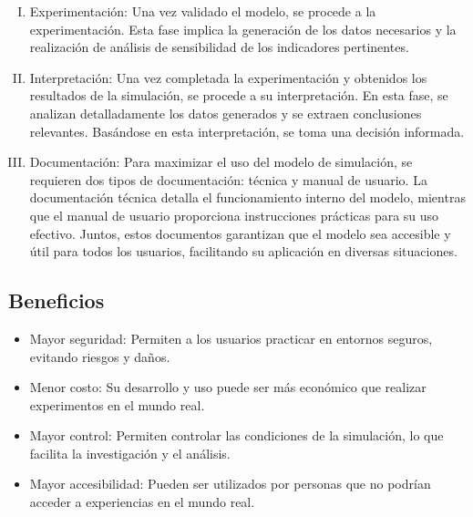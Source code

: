 \begin{enumerate} [I. ]
\begin{itemize}
        \item Evaluación de la precisión en la predicción de eventos futuros.
        \item Comprobación de la falla del modelo de simulación al utilizar datos que causen fallas en el sistema real.
        \item Aceptación y confianza en el modelo por parte de las personas que utilizarán los resultados generados por el experimento de simulación.
    \end{itemize}
    \item Experimentación: 
    Una vez validado el modelo, se procede a la experimentación. Esta fase implica la generación de los datos necesarios y la realización de análisis de sensibilidad de los indicadores pertinentes. 
    \item Interpretación: 
    Una vez completada la experimentación y obtenidos los resultados de la simulación, se procede a su interpretación. En esta fase, se analizan detalladamente los datos generados y se extraen conclusiones relevantes. Basándose en esta interpretación, se toma una decisión informada.
    \item Documentación: 
    Para maximizar el uso del modelo de simulación, se requieren dos tipos de documentación: técnica y manual de usuario. La documentación técnica detalla el funcionamiento interno del modelo, mientras que el manual de usuario proporciona instrucciones prácticas para su uso efectivo. Juntos, estos documentos garantizan que el modelo sea accesible y útil para todos los usuarios, facilitando su aplicación en diversas situaciones.
\end{enumerate}
\subsection{Beneficios}
\begin{itemize}
    \item Mayor seguridad: 
    Permiten a los usuarios practicar en entornos seguros, evitando riesgos y daños.
    \item Menor costo: 
    Su desarrollo y uso puede ser más económico que realizar experimentos en el mundo real. 
    \item Mayor control: Permiten controlar las condiciones de la simulación, lo que facilita la investigación y el análisis.
    \item Mayor accesibilidad: Pueden ser utilizados por personas que no podrían acceder a experiencias en el mundo real.
\end{itemize}
